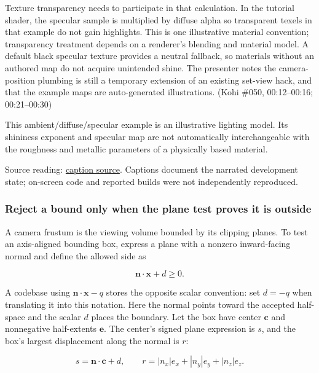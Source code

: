 Texture transparency needs to participate in that calculation. In the tutorial shader, the specular sample is multiplied by diffuse alpha so transparent texels in that example do not gain highlights. This is one illustrative material convention; transparency treatment depends on a renderer's blending and material model. A default black specular texture provides a neutral fallback, so materials without an authored map do not acquire unintended shine. The presenter notes the camera-position plumbing is still a temporary extension of an existing set-view hack, and that the example maps are auto-generated illustrations. (Kohi \#050, 00:12--00:16; 00:21--00:30)

This ambient/diffuse/specular example is an illustrative lighting model. Its shininess exponent and specular map are not automatically interchangeable with the roughness and metallic parameters of a physically based material.

Source reading: \href{https://www.youtube.com/watch?v=9O--xSmf5NU}{caption source}. Captions document the narrated development state; on-screen code and reported builds were not independently reproduced.

\subsubsection{Reject a bound only when the plane test proves it is outside}\label{06-engine-ii-ch026-reject-a-bound-only-when-the-plane-test-proves-it-is-outside}

\hypertarget{06-engine-ii-ch026-reject-a-bound-only-when-the-plane-test-proves-it-is-outside}{}

A camera frustum is the viewing volume bounded by its clipping planes. To test an axis-aligned bounding box, express a plane with a nonzero inward-facing normal and define the allowed side as

\[
\mathbf n\cdot\mathbf x+d\geq0.
\]

A codebase using \(\mathbf n\cdot\mathbf x-q\) stores the opposite scalar convention: set \(d=-q\) when translating it into this notation. Here the normal points toward the accepted half-space and the scalar \(d\) places the boundary. Let the box have center \(\mathbf c\) and nonnegative half-extents \(\mathbf e\). The center's signed plane expression is \(s\), and the box's largest displacement along the normal is \(r\):

\[
s=\mathbf n\cdot\mathbf c+d,
\qquad
r=|n_x|e_x+|n_y|e_y+|n_z|e_z.
\]

